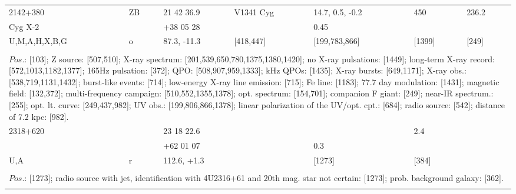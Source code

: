 \documentclass{aa}
\begin{document}
\begin{tabular}{p{2.5cm}p{1cm}p{1.8cm}p{2.3cm}p{3.3cm}p{2.0cm}p{2.2cm}}
\noalign{\smallskip}
2142+380            & ZB         & 21 42 36.9         & V1341 Cyg          & 14.7, 0.5, -0.2           & 450           & 236.2    \\
Cyg X-2               &                & +38 05 28          &                               & 0.45                            &                  &             \\
U,M,A,H,X,B,G  & o            & 87.3, -11.3         & [418,447]              &  [199,783,866]         & [1399]      & [249]   \\
\\
\multicolumn{7}{p{17.5cm}}{
$Pos$.: [103]; Z source: [507,510]; X-ray spectrum: [201,539,650,780,1375,1380,1420]; no X-ray pulsations: [1449]; 
long-term X-ray record: [572,1013,1182,1377]; 165Hz pulsation: [372];  QPO: [508,907,959,1333]; kHz QPOs: 
[1435]; X-ray bursts: [649,1171]; X-ray obs.: [538,719,1131,1432]; burst-like events: [714]; low-energy X-ray 
line emission: [715]; Fe line: [1183]; 77.7 day modulation: [1431]; magnetic field: [132,372]; 
multi-frequency campaign: [510,552,1355,1378]; opt. spectrum: [154,701]; companion F giant: [249]; near-IR 
spectrum.: [255]; opt. lt. curve: [249,437,982]; UV obs.: [199,806,866,1378]; linear polarization of the UV/opt. cpt.: 
[684]; radio source: [542]; distance of 7.2 kpc: [982].}\\
\noalign{\smallskip}
\hline

\noalign{\smallskip}
2318+620            &              & 23 18 22.6           &                   &                             & 2.4                        &          \\
                              &              & +62 01 07            &                   & 0.3                       &                              &         \\
U,A                       & r           & 112.6, +1.3          &                   & [1273]                 & [384]                    &          \\
\\
\multicolumn{7}{p{17.5cm}}{
$Pos$.: [1273]; radio source with jet, identification with 4U2316+61 and 20th mag. star not certain: [1273]; 
prob. background galaxy: [362].}\\
\noalign{\smallskip}
\hline

\end{tabular}
\end{document}
